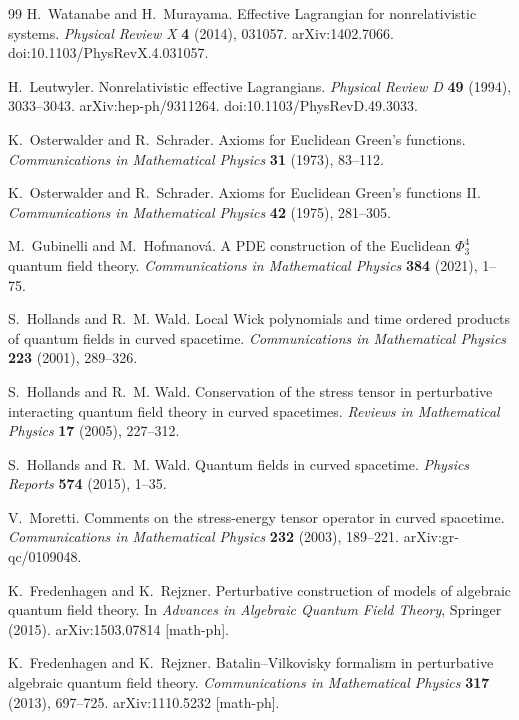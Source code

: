 \begin{thebibliography}{99}
H.~Watanabe and H.~Murayama.
Effective Lagrangian for nonrelativistic systems.
\emph{Physical Review X} \textbf{4} (2014), 031057.
arXiv:1402.7066.
doi:10.1103/PhysRevX.4.031057.

H.~Leutwyler.
Nonrelativistic effective Lagrangians.
\emph{Physical Review D} \textbf{49} (1994), 3033--3043.
arXiv:hep-ph/9311264.
doi:10.1103/PhysRevD.49.3033.

K.~Osterwalder and R.~Schrader.
Axioms for Euclidean Green's functions.
\emph{Communications in Mathematical Physics} \textbf{31} (1973), 83--112.

K.~Osterwalder and R.~Schrader.
Axioms for Euclidean Green's functions II.
\emph{Communications in Mathematical Physics} \textbf{42} (1975), 281--305.

M.~Gubinelli and M.~Hofmanov\'a.
A PDE construction of the Euclidean \(\Phi^4_3\) quantum field theory.
\emph{Communications in Mathematical Physics} \textbf{384} (2021), 1--75.

S.~Hollands and R.~M. Wald.
Local Wick polynomials and time ordered products of quantum fields in curved
spacetime.
\emph{Communications in Mathematical Physics} \textbf{223} (2001), 289--326.

S.~Hollands and R.~M. Wald.
Conservation of the stress tensor in perturbative interacting quantum field
theory in curved spacetimes.
\emph{Reviews in Mathematical Physics} \textbf{17} (2005), 227--312.

S.~Hollands and R.~M. Wald.
Quantum fields in curved spacetime.
\emph{Physics Reports} \textbf{574} (2015), 1--35.

V.~Moretti.
Comments on the stress-energy tensor operator in curved spacetime.
\emph{Communications in Mathematical Physics} \textbf{232} (2003), 189--221.
arXiv:gr-qc/0109048.

K.~Fredenhagen and K.~Rejzner.
Perturbative construction of models of algebraic quantum field theory.
In \emph{Advances in Algebraic Quantum Field Theory}, Springer (2015).
arXiv:1503.07814 [math-ph].

K.~Fredenhagen and K.~Rejzner.
Batalin--Vilkovisky formalism in perturbative algebraic quantum field theory.
\emph{Communications in Mathematical Physics} \textbf{317} (2013), 697--725.
arXiv:1110.5232 [math-ph].


\end{thebibliography}
